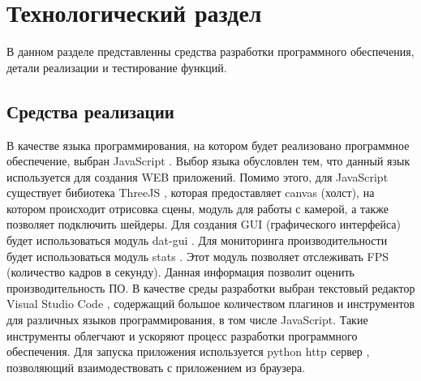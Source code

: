 \chapter{Технологический раздел}
\label{cha:impl}
В данном разделе представленны средства разработки программного обеспечения, детали реализации и тестирование функций.
\section{Средства реализации}
В качестве языка программирования, на котором будет реализовано программное обеспечение, выбран JavaScript \cite{impl:js}. Выбор языка обусловлен тем, 
что данный язык используется для создания WEB приложений. Помимо этого, для JavaScript существует бибиотека 
ThreeJS \cite{impl:three_js}, которая предоставляет canvas (холст), на котором происходит отрисовка сцены, модуль для работы с камерой, а также позволяет подключить шейдеры.
Для создания GUI (графического интерфейса) будет использоваться модуль dat-gui \cite{impl:dat_gui}.
Для мониторинга производительности будет использоваться модуль stats \cite{impl:stats_js}. Этот модуль позволяет отслеживать FPS (количество кадров в секунду). Данная информация позволит оценить производительность ПО.
В качестве среды разработки выбран текстовый редактор Visual Studio Code \cite{impl:vscode}, содержащий большое количеством плагинов и инструментов для различных языков программирования, в том числе JavaScript. Такие инструменты облегчают и ускоряют процесс разработки программного обеспечения.
Для запуска приложения используется python http сервер \cite{impl:python}, позволяющий взаимодествовать с приложением из браузера.  
